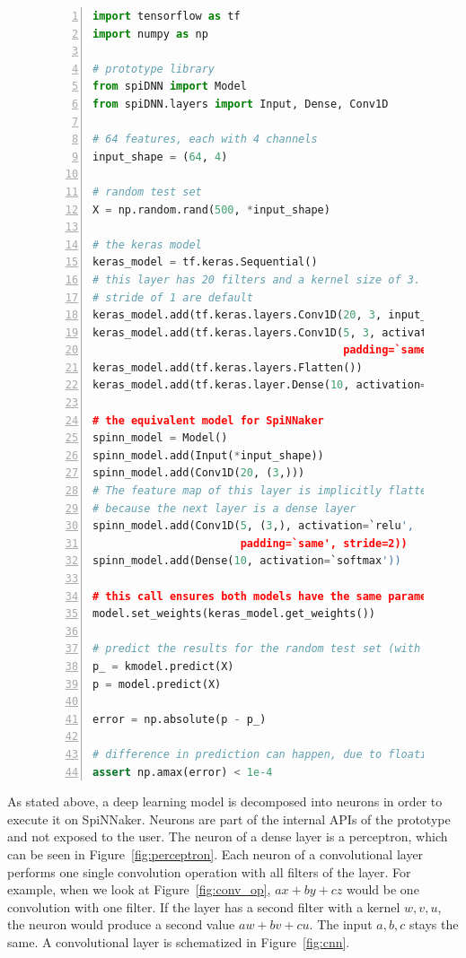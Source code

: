 \documentclass[]{article}
\begin{document}
\begin{figure} %
\begin{lstlisting}[language=Python, caption={Example code comparing
  inference with 1D CNNs in Keras to inference with the prototype.},
  captionpos=b, label=lst:spiDNN_vs_keras_cnns, numbers=left]
import tensorflow as tf
import numpy as np

# prototype library
from spiDNN import Model
from spiDNN.layers import Input, Dense, Conv1D

# 64 features, each with 4 channels
input_shape = (64, 4)

# random test set
X = np.random.rand(500, *input_shape)

# the keras model
keras_model = tf.keras.Sequential()
# this layer has 20 filters and a kernel size of 3. Valid padding and a
# stride of 1 are default
keras_model.add(tf.keras.layers.Conv1D(20, 3, input_shape=input_shape))
keras_model.add(tf.keras.layers.Conv1D(5, 3, activation=`relu',
                                       padding=`same', strides=2))
keras_model.add(tf.keras.layers.Flatten())
keras_model.add(tf.keras.layer.Dense(10, activation=`softmax'))

# the equivalent model for SpiNNaker
spinn_model = Model()
spinn_model.add(Input(*input_shape))
spinn_model.add(Conv1D(20, (3,)))
# The feature map of this layer is implicitly flattened,
# because the next layer is a dense layer
spinn_model.add(Conv1D(5, (3,), activation=`relu',
                       padding=`same', stride=2))
spinn_model.add(Dense(10, activation=`softmax'))

# this call ensures both models have the same parameters
model.set_weights(keras_model.get_weights())

# predict the results for the random test set (with random weights)
p_ = kmodel.predict(X)
p = model.predict(X)

error = np.absolute(p - p_)

# difference in prediction can happen, due to floating point errors
assert np.amax(error) < 1e-4
\end{lstlisting}
\end{figure} %

As stated above, a deep learning model is decomposed into neurons
in order to execute it on SpiNNaker.
Neurons are part of the internal APIs of the prototype and not exposed
to the user.
The neuron of a dense layer is a perceptron, which can be seen in
Figure~\ref{fig:perceptron}.
Each neuron of a convolutional layer performs one single convolution
operation with all filters of the layer.
For example, when we look at Figure~\ref{fig:conv_op}, $ax + by + cz$
would be one convolution with one filter.
If the layer has a second filter with a kernel $w, v, u$, the neuron
would produce a second value $aw + bv + cu$.
The input $a, b, c$ stays the same.
A convolutional layer is schematized in Figure~\ref{fig:cnn}.
\end{document}
